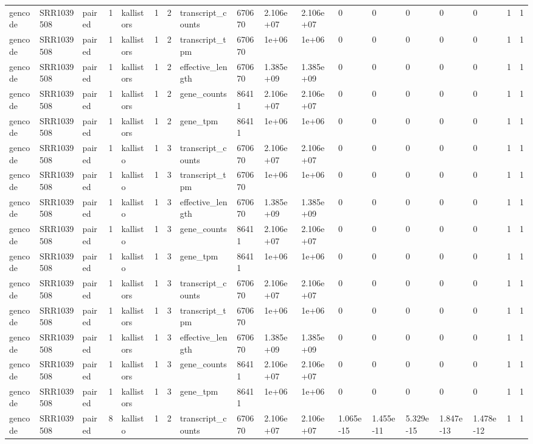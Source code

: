 \begin{tabular}{llllllllllllllllll}
gencode & SRR1039508 & paired & 1 & kallistors & 1 & 2 & transcript\_counts & 670670 & 2.106e+07 & 2.106e+07 & 0 & 0 & 0 & 0 & 0 & 1 & 1 \\
gencode & SRR1039508 & paired & 1 & kallistors & 1 & 2 & transcript\_tpm & 670670 & 1e+06 & 1e+06 & 0 & 0 & 0 & 0 & 0 & 1 & 1 \\
gencode & SRR1039508 & paired & 1 & kallistors & 1 & 2 & effective\_length & 670670 & 1.385e+09 & 1.385e+09 & 0 & 0 & 0 & 0 & 0 & 1 & 1 \\
gencode & SRR1039508 & paired & 1 & kallistors & 1 & 2 & gene\_counts & 86411 & 2.106e+07 & 2.106e+07 & 0 & 0 & 0 & 0 & 0 & 1 & 1 \\
gencode & SRR1039508 & paired & 1 & kallistors & 1 & 2 & gene\_tpm & 86411 & 1e+06 & 1e+06 & 0 & 0 & 0 & 0 & 0 & 1 & 1 \\
gencode & SRR1039508 & paired & 1 & kallisto & 1 & 3 & transcript\_counts & 670670 & 2.106e+07 & 2.106e+07 & 0 & 0 & 0 & 0 & 0 & 1 & 1 \\
gencode & SRR1039508 & paired & 1 & kallisto & 1 & 3 & transcript\_tpm & 670670 & 1e+06 & 1e+06 & 0 & 0 & 0 & 0 & 0 & 1 & 1 \\
gencode & SRR1039508 & paired & 1 & kallisto & 1 & 3 & effective\_length & 670670 & 1.385e+09 & 1.385e+09 & 0 & 0 & 0 & 0 & 0 & 1 & 1 \\
gencode & SRR1039508 & paired & 1 & kallisto & 1 & 3 & gene\_counts & 86411 & 2.106e+07 & 2.106e+07 & 0 & 0 & 0 & 0 & 0 & 1 & 1 \\
gencode & SRR1039508 & paired & 1 & kallisto & 1 & 3 & gene\_tpm & 86411 & 1e+06 & 1e+06 & 0 & 0 & 0 & 0 & 0 & 1 & 1 \\
gencode & SRR1039508 & paired & 1 & kallistors & 1 & 3 & transcript\_counts & 670670 & 2.106e+07 & 2.106e+07 & 0 & 0 & 0 & 0 & 0 & 1 & 1 \\
gencode & SRR1039508 & paired & 1 & kallistors & 1 & 3 & transcript\_tpm & 670670 & 1e+06 & 1e+06 & 0 & 0 & 0 & 0 & 0 & 1 & 1 \\
gencode & SRR1039508 & paired & 1 & kallistors & 1 & 3 & effective\_length & 670670 & 1.385e+09 & 1.385e+09 & 0 & 0 & 0 & 0 & 0 & 1 & 1 \\
gencode & SRR1039508 & paired & 1 & kallistors & 1 & 3 & gene\_counts & 86411 & 2.106e+07 & 2.106e+07 & 0 & 0 & 0 & 0 & 0 & 1 & 1 \\
gencode & SRR1039508 & paired & 1 & kallistors & 1 & 3 & gene\_tpm & 86411 & 1e+06 & 1e+06 & 0 & 0 & 0 & 0 & 0 & 1 & 1 \\
gencode & SRR1039508 & paired & 8 & kallisto & 1 & 2 & transcript\_counts & 670670 & 2.106e+07 & 2.106e+07 & 1.065e-15 & 1.455e-11 & 5.329e-15 & 1.847e-13 & 1.478e-12 & 1 & 1 \\

\end{tabular}
